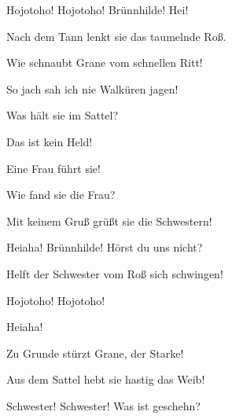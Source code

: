 \begin{drama}
Hojotoho! Hojotoho!
Brünnhilde! Hei!
 




\Waltrautespeaks
Nach dem Tann lenkt sie das taumelnde Roß.
 

\Grimgerdespeaks
Wie schnaubt Grane vom schnellen Ritt!
 

\Rossweissespeaks
So jach sah ich nie Walküren jagen!
 

\Ortlindespeaks
Was hält sie im Sattel?
 

\Helmwigespeaks
Das ist kein Held!
 

\Siegrunespeaks
Eine Frau führt sie!
 

\Gerhildespeaks
Wie fand sie die Frau?
 

\Schwertleitespeaks
Mit keinem Gruß grüßt sie die Schwestern!
 

\Waltrautespeaks


Heiaha! Brünnhilde! Hörst du uns nicht?
 

\Ortlindespeaks
Helft der Schwester
vom Roß sich schwingen!
 






Hojotoho! Hojotoho!
 

Heiaha!
 

\Waltrautespeaks


Zu Grunde stürzt Grane, der Starke!
 

\Grimgerdespeaks
Aus dem Sattel hebt sie hastig das Weib!
 



Schwester! Schwester! Was ist geschehn?
 




\Brunnhildespeaks



\end{drama}
